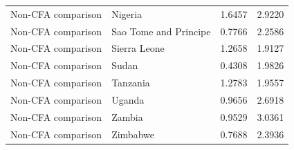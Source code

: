 \begin{table}
\begin{tabular}[t]{llrr}
Non-CFA comparison & Nigeria & 1.6457 & 2.9220\\
Non-CFA comparison & Sao Tome and Principe & 0.7766 & 2.2586\\
Non-CFA comparison & Sierra Leone & 1.2658 & 1.9127\\
\addlinespace
Non-CFA comparison & Sudan & 0.4308 & 1.9826\\
Non-CFA comparison & Tanzania & 1.2783 & 1.9557\\
Non-CFA comparison & Uganda & 0.9656 & 2.6918\\
Non-CFA comparison & Zambia & 0.9529 & 3.0361\\
Non-CFA comparison & Zimbabwe & 0.7688 & 2.3936\\
\bottomrule
\end{tabular}
\end{table}